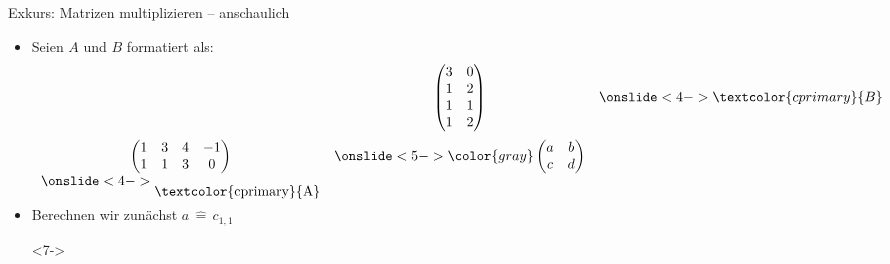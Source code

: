 \begin{frame}[t,fragile]{Exkurs: Matrizen multiplizieren -- anschaulich}
    \vspace*{-\baselineskip}%
    \begin{itemize}[<+(1)->]
        \item Seien \(A\) und \(B\) formatiert als:\pause{}
        \[\begin{array}{ccc}
            &  \begin{pmatrix}
              3 & 0 \\
              1 & 2 \\
              1 & 1 \\
              1 & 2
            \end{pmatrix} & \onslide<4->{\textcolor{cprimary}{B}}\\[2.4em]
            \begin{pmatrix}
                1 & 3 & 4 & -1\\
                1 & 1 & 3 & 0
            \end{pmatrix} & \onslide<5->{\color{gray}\begin{pmatrix}
              a&b\\
              c&d
            \end{pmatrix}} \\
            \onslide<4->{\fakepad{\textcolor{cprimary}{A}}}
        \end{array}\]
        \item<6-> Berechnen wir zunächst \(a \,\widehat{=}\, c_{1,1}\)
        \item[]<7-> 
    \end{itemize}
\end{frame}


